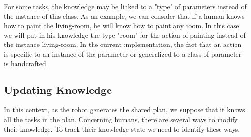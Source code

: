 \documentclass{llncs}
\begin{document}
For some tasks, the knowledge may be linked to a "type" of parameters instead of the instance of this class.
As an example, we can consider that if a human knows how to paint the living-room, he will know how to paint any room. In this case we will put in his knowledge the type "room" for the action of painting instead of the instance living-room.
%
%
%
%
%
%
%
In the current implementation, the fact that an action is specific to an instance of the parameter or generalized to a class of parameter is handcrafted.


\subsection{Updating Knowledge}

In this context, as the robot generates the shared plan, we suppose that it knows all the tasks in the plan.
Concerning humans, there are several ways to modify their knowledge. To track their knowledge state we need to identify these ways.
\end{document}
